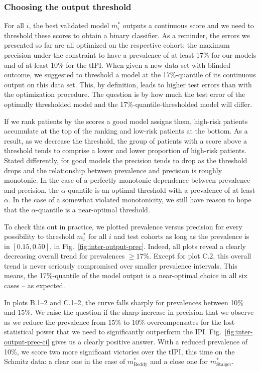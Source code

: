 \subsubsection{Choosing the output threshold}




For all $i$, the best validated model $m_i^*$ outputs a continuous score and we need to threshold 
these scores to obtain a binary classifier. As a reminder, the errors 
we presented so far are all optimized on the respective cohort: the maximum precision under the 
constraint to have a prevalence of at least \num{17}\% for our models and of at least \num{10}\% 
for the tIPI. When given a new data set with blinded outcome, we suggested to threshold a model at 
the \num{17}\%-quantile of its continuous output on this data set. This, by definition, leads to 
higher test errors than with the optimization procedure. The question is by how much the test error 
of the optimally thresholded model and the \num{17}\%-quantile-thresholded model will differ.

If we rank patients by the scores a good model assigns them, high-risk patients accumulate at the 
top of the ranking and low-risk patients at the bottom. As a result, as we decrease the threshold, 
the group of patients with a score above a threshold tends to comprise a lower and lower proportion 
of high-risk patients. Stated differently, for good models the precision tends to drop as the 
threshold drops and the relationship between prevalence and precision is roughly monotonic. In the 
case of a perfectly monotonic dependence between prevalence and precision, the $\alpha$-quantile 
is an optimal threshold with a prevalence of at least $\alpha$. 
In the case of a somewhat violated monotonicity, we still have reason to hope that the 
$\alpha$-quantile is a near-optimal threshold.

To check this out in practice, we plotted prevalence versus precision for every possibility to 
threshold $m^*_i$ for all $i$ and test cohorts as long as the prevalence is in $[\num{0.15}, 
\num{0.50}]$, in Fig.\ \ref{fig:inter-output-prec}.  Indeed, all 
plots reveal a clearly decreasing overall trend for prevalences $\geq \num{17}\%$. 
Except for plot C.2, this overall trend is never seriously compromised over smaller 
prevalence intervals. This means, the \num{17}\%-quantile of the model output is a near-optimal 
choice in all six cases -- as expected.

In plots B.1--2 and C.1--2, the curve falls sharply for prevalences between \num{10}\% and \num{15}\%. 
We raise the question if the sharp increase in precision that we observe as we reduce the prevalence 
from \num{15}\% to \num{10}\% overcompensates for the lost statistical power that we need to 
significantly outperform the IPI. Fig.\ \ref{fig:inter-output-prec-ci} gives us a clearly 
positive answer. With a reduced prevalence of \num{10}\%, we score two more significant victories 
over the tIPI, this time on the Schmitz data: a clear one in the case of $m^*_\text{Reddy}$ and a 
close one for $m^*_\text{Staiger}$. 

